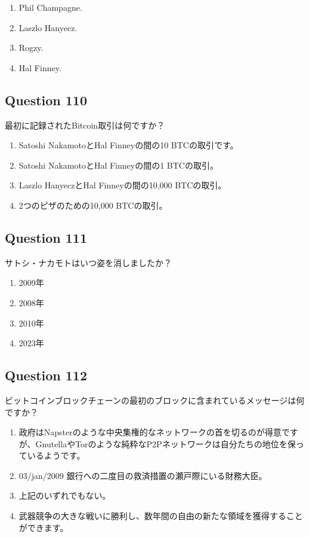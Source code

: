 \documentclass[12pt,a4paper]{article}
\begin{document}
\begin{enumerate}[label=\Alph*., leftmargin=*]
\item Phil Champagne.
\item Laszlo Hanyecz.
\item Rogzy.
\item Hal Finney.
\end{enumerate}

\bigskip


\subsection*{Question 110}
最初に記録されたBitcoin取引は何ですか？

\begin{enumerate}[label=\Alph*., leftmargin=*]
\item Satoshi NakamotoとHal Finneyの間の10 BTCの取引です。
\item Satoshi NakamotoとHal Finneyの間の1 BTCの取引。
\item Laszlo HanyeczとHal Finneyの間の10,000 BTCの取引。
\item 2つのピザのための10,000 BTCの取引。
\end{enumerate}

\bigskip


\subsection*{Question 111}
サトシ・ナカモトはいつ姿を消しましたか？

\begin{enumerate}[label=\Alph*., leftmargin=*]
\item 2009年
\item 2008年
\item 2010年
\item 2023年
\end{enumerate}

\bigskip


\subsection*{Question 112}
ビットコインブロックチェーンの最初のブロックに含まれているメッセージは何ですか？

\begin{enumerate}[label=\Alph*., leftmargin=*]
\item 政府はNapsterのような中央集権的なネットワークの首を切るのが得意ですが、GnutellaやTorのような純粋なP2Pネットワークは自分たちの地位を保っているようです。
\item 03/jan/2009 銀行への二度目の救済措置の瀬戸際にいる財務大臣。
\item 上記のいずれでもない。
\item 武器競争の大きな戦いに勝利し、数年間の自由の新たな領域を獲得することができます。
\end{enumerate}
\end{document}
